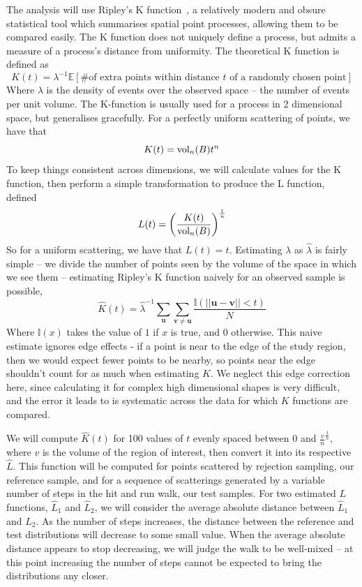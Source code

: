 The analysis will use Ripley's K function~\cite{Dixon06}, a relatively modern and obsure statistical tool which summarises spatial point processes, allowing them to be compared easily. The K function does not uniquely define a process, but admits a measure of a process's distance from uniformity. The theoretical K function is defined as
$$
K(t) = \lambda^{-1}\mathbb{E}[\mbox{\# of extra points within distance $t$ of a randomly chosen point}]
$$
Where $\lambda$ is the density of events over the observed space -- the number of events per unit volume. The K-function is usually used for a process in 2 dimensional space, but generalises gracefully. For a perfectly uniform scattering of points, we have that
$$
K(t) = \mbox{vol}_n(B)t^n
$$
To keep things consistent across dimensions, we will calculate values for the K function, then perform a simple transformation to produce the L function, defined
$$
L(t) = \left(\frac{K(t)}{\mbox{vol}_n(B)}\right)^{\frac{1}{n}}
$$
So for a uniform scattering, we have that $L(t) = t$. Estimating $\lambda$ as $\widehat{\lambda}$ is fairly simple -- we divide the number of points seen by the volume of the space in which we see them -- estimating Ripley's K function naively for an observed sample is possible,
$$
\widehat{K}(t) =  \widehat{\lambda}^{-1} \sum_{\bm{u}} \sum_{\bm{v} \neq \bm{u}} \frac{\mathbb{I}(||\bm{u}-\bm{v}|| < t)}{N}
$$
Where $\mathbb{I}(x)$ takes the value of $1$ if $x$ is true, and $0$ otherwise. This naive estimate ignores edge effects - if a point is near to the edge of the study region, then we would expect fewer points to be nearby, so points near the edge shouldn't count for as much when estimating $K$. We neglect this edge correction here, since calculating it for complex high dimensional shapes is very difficult, and the error it leads to is systematic across the data for which $K$ functions are compared.

We will compute $\widehat{K}(t)$ for 100 values of $t$ evenly spaced between 0 and $\frac{v}{n}^{\frac{1}{n}}$, where $v$ is the volume of the region of interest, then convert it into its respective $\widehat{L}$. This function will be computed for points scattered by rejection sampling, our reference sample, and for a sequence of scatterings generated by a variable number of steps in the hit and run walk, our test samples. For two estimated $L$ functions, $\widehat{L}_1$ and $\widehat{L}_2$, we will consider the average absolute distance between $\widehat{L}_1$ and $\widehat{L}_2$. As the number of steps increases, the distance between the reference and test distributions will decrease to some small value. When the average absolute distance appears to stop decreasing, we will judge the walk to be well-mixed -- at this point increasing the number of steps cannot be expected to bring the distributions any closer.


